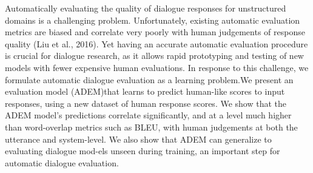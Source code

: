 Automatically evaluating the quality of dialogue responses for unstructured domains is a challenging problem.  Unfortunately, existing automatic evaluation metrics are biased and correlate very poorly with human judgements of response quality (Liu et al., 2016). Yet having an accurate automatic evaluation procedure is crucial for dialogue research, as it allows rapid prototyping and testing of new models with fewer expensive human evaluations. In response to this challenge, we formulate automatic dialogue evaluation as a learning problem.We present an evaluation model (ADEM)that learns to predict human-like scores to input responses, using a new dataset of human response scores.   We show that the ADEM model's predictions correlate significantly,  and at a level much higher than word-overlap metrics such as BLEU, with human judgements at both the utterance and system-level. We also show that ADEM can generalize to evaluating dialogue mod-els unseen during training,                    an important step for automatic dialogue evaluation.
